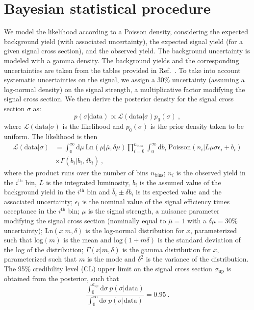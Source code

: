 \section{Bayesian statistical procedure}
We model the likelihood according to a Poisson density,
considering the expected background yield (with associated
uncertainty), the expected signal yield (for a given signal cross
section), and the observed yield. The background uncertainty is modeled with a gamma density. The
background yields and the corresponding uncertainties are taken from the tables provided
in Ref.~\cite{RazorHgaga}. To take into account systematic
uncertainties on the signal, we assign a 30\% uncertainty (assuming a
log-normal density) on the signal strength, a multiplicative
factor modifying the signal cross section. We then derive the
posterior density for the signal cross section $\sigma$ as:
\begin{equation}
p(\sigma|\mathrm{data}) \propto \mathcal L(\mathrm{data} |\sigma)p_0(\sigma)~,
\label{eqn:posterior}
\end{equation}
where $\mathcal L(\mathrm{data} |\sigma)$ is the likelihood and $p_0(\sigma)$ is the prior density taken to be
uniform. The likelihood is then
\begin{align}
\mathcal L(\mathrm{data} |\sigma) &=\int_{0}^{\infty}\mathrm{d}\mu~\mathrm{Ln}(\mu|\bar\mu,\delta\mu)\prod_{i=0}^{n_{\mathrm{bins}}}\int_0^{\infty} \mathrm{d}b_i~
   \mathrm{Poisson}(n_i|L\mu\sigma\epsilon_i+ b_i)\nonumber\\
&\times\Gamma(b_i|\bar{b}_i,\delta b_i)~,
\label{eqn:likelihood}
\end{align}
where the product runs over the number of bins $n_{\mathrm{bins}}$; $n_i$ is the
observed yield in the $i^{\mathrm{th}}$ bin, $L$ is the integrated
luminosity, $b_i$ is the assumed value of the background yield in the
$i^{\mathrm{th}}$ bin and $\bar{b}_i\pm \delta b_i$ is its expected value
and the associated uncertainty; $\epsilon_i$ is the nominal value
of the signal efficiency times acceptance in the $i^{\mathrm{th}}$ bin; $\mu$ is the
signal strength, a nuisance parameter modifying the signal cross section
(nominally equal to $\bar\mu=1$ with a $\delta\mu=30\%$ uncertainty);
$\mathrm{Ln}(x|m,\delta)$ is the log-normal
distribution for $x$, parameterized such that $\mathrm{log}(m)$ is the
mean and $\mathrm{log}(1+m\delta)$ is the standard deviation of the
log of the distribution; $\Gamma(x|m,\delta)$ is the gamma
distribution for $x$, parameterized such that $m$ is the
mode and $\delta^2$ is the variance of the distribution. The 95\%
credibility level (CL) upper limit on the
signal cross section $\sigma_{\mathrm{up}}$ is obtained from the
posterior, such that 
\begin{equation}
\frac{\int_0^{\sigma_{\mathrm{up}}}\mathrm{d}\sigma~ p(\sigma|\mathrm{data})}{\int_0^{\infty}\mathrm{d}\sigma~ p(\sigma|\mathrm{data})} = 0.95~.
\end{equation}

